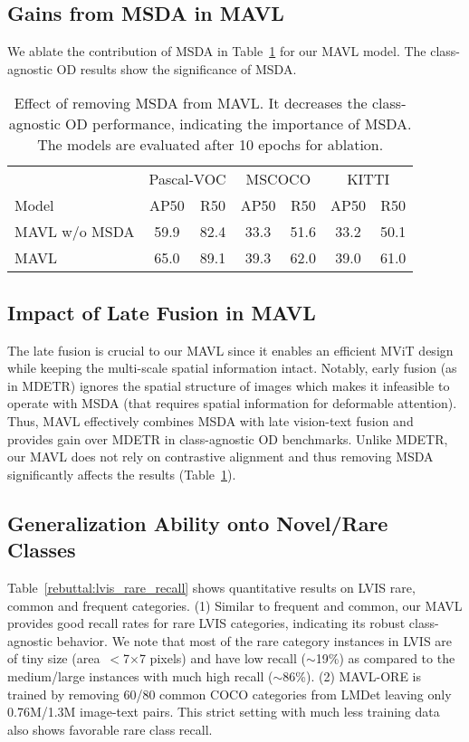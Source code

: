 \documentclass[runningheads]{llncs}
\begin{document}
\subsection{Gains from MSDA in MAVL}
We ablate the contribution of MSDA in Table~\ref{rebuttal:msda_contribution} for our MAVL model. The class-agnostic OD results show the significance of MSDA.

\begin{table}[!h]
\centering
\begin{tabular}{lcccccc}
\toprule
\rowcolor{Gray} & \multicolumn{2}{c}{Pascal-VOC} & \multicolumn{2}{c}{MSCOCO} & \multicolumn{2}{c}{KITTI} \\
\rowcolor{Gray} Model & AP50 & R50 & AP50 & R50 & AP50 & R50 \\
\midrule
\midrule

MAVL w/o MSDA & 59.9 & 82.4 & 33.3 & 51.6 & 33.2 & 50.1 \\
MAVL & 65.0 & 89.1 & 39.3 & 62.0 & 39.0 & 61.0 \\
\bottomrule
\end{tabular}
\caption{Effect of removing MSDA from MAVL. It decreases the class-agnostic OD performance, indicating the importance of MSDA. The models are evaluated after 10 epochs for ablation.}
\label{rebuttal:msda_contribution}
\end{table}


\subsection{Impact of Late Fusion in MAVL}
The late fusion is crucial to our MAVL since it enables an efficient MViT design while keeping the multi-scale spatial information intact. Notably, early fusion (as in MDETR) ignores the spatial structure of images which makes it infeasible to operate with MSDA (that requires spatial information for deformable attention). Thus, MAVL effectively combines MSDA with late vision-text fusion and provides gain over MDETR in class-agnostic OD benchmarks. Unlike MDETR, our MAVL does not rely on contrastive alignment and thus removing MSDA significantly affects the results (Table~\ref{rebuttal:msda_contribution}).

\subsection{Generalization Ability onto Novel/Rare Classes}
Table~\ref{rebuttal:lvis_rare_recall} shows quantitative results on LVIS rare, common and frequent categories. (1) Similar to frequent and common, our MAVL provides good recall rates for rare LVIS categories, indicating its robust class-agnostic behavior. We note that most of the rare category instances in LVIS are of tiny size (area~$<$7${\times}$7 pixels) and have low recall ($\sim$19\%) as compared to the medium/large instances with much high recall ($\sim$86\%). (2) MAVL-ORE is trained by removing 60/80 common COCO categories from LMDet leaving only 0.76M/1.3M image-text pairs. This strict setting with much less training data also shows favorable rare class recall.
\end{document}
